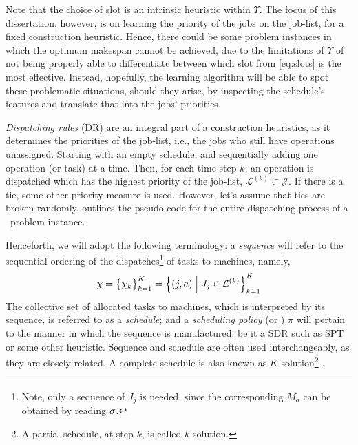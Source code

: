 Note that the choice of slot is an intrinsic heuristic within $\Upsilon$.
The focus of this dissertation, however, is on learning the priority of the 
jobs on the job-list, for a fixed construction heuristic. 
Hence, there could be some problem instances in which the optimum makespan 
cannot be achieved, due to the limitations of $\Upsilon$ of not being properly 
able to differentiate between which slot from \cref{eq:slots} is the most 
effective.
Instead, hopefully, the learning algorithm will be able to spot these 
problematic situations, should they arise, by inspecting the schedule's 
features and translate that into the jobs' priorities.

\emph{Dispatching rules} (DR) are an integral part of a construction 
heuristics, as it determines the priorities of the job-list, i.e., 
the jobs who still have operations unassigned. 
Starting with an empty schedule, and sequentially adding one operation (or 
task) at a time. Then, for each time step $k$, an operation is dispatched which 
has the highest priority of the 
job-list, \mbox{$\mathcal{L}^{(k)}\subset\mathcal{J}$}.
If there is a tie, some other priority measure is used. 
However, let's assume that ties are broken randomly. 
 outlines the pseudo code for the entire dispatching 
process of a \JSP\ problem instance.



Henceforth, we will adopt the following terminology: a \emph{sequence} will 
refer to the sequential ordering of the dispatches\footnote{Note, 
    only a sequence of $J_j$ is needed, since the corresponding $M_a$ can be 
    obtained by reading ${\mathbf{\sigma}}$.} 
of tasks to machines, namely, 
\begin{equation}
{\mathbf{\chi}} = \big\{\chi_k\big\}_{k=1}^K
= \left\{(j,a)\;\middle|\;J_j\in\mathcal{L}^{(k)}\right\}_{k=1}^K
\end{equation}
The collective set of allocated tasks to machines, which is interpreted by its 
sequence, is referred to as a \emph{schedule};
and a \emph{scheduling policy} (or \dr) $\pi$ will pertain to the manner in 
which the sequence is manufactured: be it a 
SDR such as SPT or some other heuristic. 
Sequence and schedule are often used interchangeably, as they are closely 
related. A complete schedule is also known as $K$-solution\footnote{A partial 
    schedule, at step $k$, is called $k$-solution.} \citep{Bertsekas97}.

